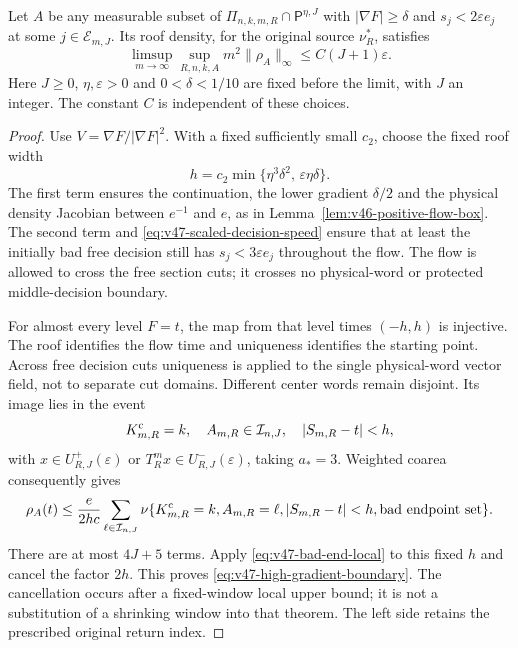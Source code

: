 \begin{proposition}
\label{prop:v47-high-gradient-boundary}
Let $A$ be any measurable subset of
$\Pi_{n,k,m,R}\cap\mathsf P^{\eta,J}$ with
$|\nabla F|\ge\delta$ and
$s_j<2\varepsilon e_j$ at some $j\in\mathcal E_{m,J}$.
Its roof density, for the original source $\nu_R^*$, satisfies
\begin{equation}\label{eq:v47-high-gradient-boundary}
 \limsup_{m\to\infty}\sup_{R,n,k,A}m^2\|\rho_A\|_\infty
                                      \le C(J+1)\varepsilon.
\end{equation}
Here $J\ge0$, $\eta,\varepsilon>0$ and $0<\delta<1/10$ are fixed
before the limit, with $J$ an integer. The constant $C$ is independent of these choices.
\end{proposition}
\begin{proof}
Use $V=\nabla F/|\nabla F|^2$. With a fixed sufficiently small $c_2$,
choose the fixed roof width
\begin{equation}\label{eq:v47-free-flow-width}
 h=c_2\min\{\eta^3\delta^2,\,\varepsilon\eta\delta\}.
\end{equation}
The first term ensures the continuation, the lower gradient
$\delta/2$ and the physical density Jacobian between $e^{-1}$ and $e$,
as in Lemma~\ref{lem:v46-positive-flow-box}. The second term and
\eqref{eq:v47-scaled-decision-speed} ensure that at least the initially
bad free decision still has $s_j<3\varepsilon e_j$ throughout the flow.
The flow is allowed to cross the free section cuts; it crosses no
physical-word or protected middle-decision boundary.

For almost every level $F=t$, the map from that level times $(-h,h)$
is injective. The roof identifies the flow time and uniqueness
identifies the starting point. Across free decision cuts uniqueness
is applied to the single physical-word vector field, not to separate
cut domains. Different center words remain disjoint. Its image lies
in the event
\[
 K^{\rm c}_{m,R}=k,\quad A_{m,R}\in\mathcal I_{n,J},\quad
 |S_{m,R}-t|<h,
\]
with $x\in U^+_{R,J}(\varepsilon)$ or
$T_R^mx\in U^-_{R,J}(\varepsilon)$, taking $a_*=3$.
Weighted coarea consequently gives
\begin{equation}\label{eq:v47-flow-to-relaxed-window}
 \rho_A(t)\le\frac{e}{2hc}
   \sum_{\ell\in\mathcal I_{n,J}}
   \nu\{K^{\rm c}_{m,R}=k,A_{m,R}=\ell,|S_{m,R}-t|<h,
                                     \text{bad endpoint set}\}.
\end{equation}
There are at most $4J+5$ terms. Apply
\eqref{eq:v47-bad-end-local} to this fixed $h$ and cancel the factor
$2h$. This proves \eqref{eq:v47-high-gradient-boundary}.
The cancellation occurs after a fixed-window local upper bound;
it is not a substitution of a shrinking window into that theorem.
The left side retains the prescribed original return index.
\end{proof}

